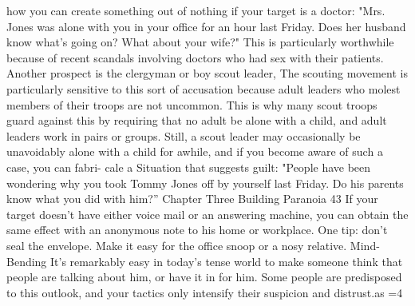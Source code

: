 \documentclass{book}
\begin{document}
how you can create something out of nothing if your target is a 
doctor: 
"Mrs. Jones was alone with you in your office for an 
hour last Friday. Does her husband know what's going 
on? What about your wife?" 
This is particularly worthwhile because of recent scandals 
involving doctors who had sex with their patients. Another 
prospect is the clergyman or boy scout leader, 
The scouting movement is particularly sensitive to this sort 
of accusation because adult leaders who molest members of 
their troops are not uncommon. This is why many scout troops 
guard against this by requiring that no adult be alone with a 
child, and adult leaders work in pairs or groups. Still, a scout 
leader may occasionally be unavoidably alone with a child for 
awhile, and if you become aware of such a case, you can fabri- 
cale a Situation that suggests guilt: 
"People have been wondering why you took Tommy 
Jones off by yourself last Friday. Do his parents know 
what you did with him?” 
Chapter Three 
Building Paranoia 
43 
If your target doesn't have either voice mail or an answering 
machine, you can obtain the same effect with an anonymous 
note to his home or workplace. One tip: don't seal the envelope. 
Make it easy for the office snoop or a nosy relative. 
Mind-Bending 
It's remarkably easy in today's tense world to make someone 
think that people are talking about him, or have it in for him. 
Some people are predisposed to this outlook, and your tactics 
only intensify their suspicion and distrust.as 
=4 
\end{document}
